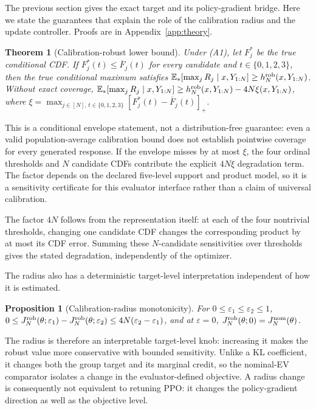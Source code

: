 \documentclass{article}
\newtheorem{proposition}{Proposition}
\newtheorem{theorem}{Theorem}
\theoremstyle{definition}
\theoremstyle{remark}
\begin{document}
The previous section gives the exact target and its policy-gradient bridge.
Here we state the guarantees that explain the role of the calibration radius
and the update controller.  Proofs are in Appendix~\ref{app:theory}.

\begin{theorem}[Calibration-robust lower bound]
\label{thm:coverage-summary}
Under (A1), let \(F_j^*\) be the true conditional CDF.  If
\(F_j^*(t)\le\overline F_j(t)\) for every candidate and
\(t\in\{0,1,2,3\}\), then
the true conditional maximum satisfies
\(\mathbb E_*[\max_jR_j\mid x,Y_{1:N}]\ge h_N^{\rm rob}(x,Y_{1:N})\).
Without exact coverage,
\(\mathbb E_*[\max_jR_j\mid x,Y_{1:N}]
\ge h_N^{\rm rob}(x,Y_{1:N})-4N\xi(x,Y_{1:N})\), where
\(\xi=\max_{j\in[N],\,t\in\{0,1,2,3\}}
[F_j^*(t)-\overline F_j(t)]_+\).
\end{theorem}

This is a conditional envelope statement, not a distribution-free guarantee:
even a valid population-average calibration bound does not establish
pointwise coverage for every generated response.  If the envelope misses by at most
\(\xi\), the four ordinal thresholds and \(N\) candidate CDFs contribute the
explicit \(4N\xi\) degradation term.  The factor depends on the declared
five-level support and product model, so it is a sensitivity certificate for
this evaluator interface rather than a claim of universal calibration.

The factor \(4N\) follows from the representation itself: at each of the four
nontrivial thresholds, changing one candidate CDF changes the corresponding
product by at most its CDF error.  Summing these \(N\)-candidate sensitivities
over thresholds gives the stated degradation, independently of the optimizer.

The radius also has a deterministic target-level interpretation independent of
how it is estimated.
\begin{proposition}[Calibration-radius monotonicity]
\label{prop:radius-monotonicity}
For \(0\le\varepsilon_1\le\varepsilon_2\le1\),
\(0\le J_N^{\rm rob}(\theta;\varepsilon_1)-J_N^{\rm rob}(\theta;\varepsilon_2)
\le4N(\varepsilon_2-\varepsilon_1)\), and at \(\varepsilon=0\),
\(J_N^{\rm rob}(\theta;0)=J_N^{\rm nom}(\theta)\).
\end{proposition}
The radius is therefore an interpretable target-level knob: increasing it makes
the robust value more conservative with bounded sensitivity.  Unlike a KL
coefficient, it changes both the group target and its marginal credit, so the
nominal-EV comparator isolates a change in the evaluator-defined objective.  A
radius change is consequently not equivalent to retuning PPO: it changes the
policy-gradient direction as well as the objective level.
\end{document}
